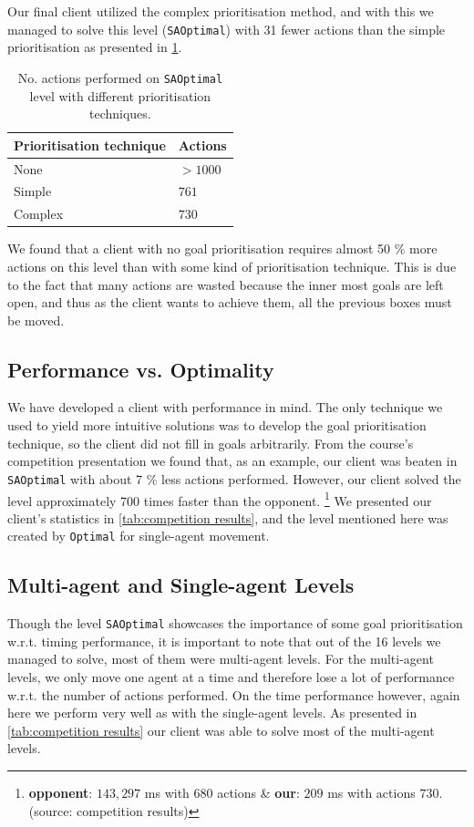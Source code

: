 Our final client utilized the complex prioritisation method, and with this we managed to solve this level (\texttt{SAOptimal}) with 31 fewer actions than the simple prioritisation as presented in \cref{tab:SAOptimal_results}.

\begin{table}[h!]
  \centering
  \begin{tabular}{@{}ll@{}}
    \toprule
    Prioritisation technique & Actions \\
    \midrule
    None    & $>1000$ \\
    Simple  & $761$ \\
    Complex & $730$ \\
    \bottomrule
  \end{tabular}
  \caption{\label{tab:SAOptimal_results}No. actions performed on \texttt{SAOptimal} level with different prioritisation techniques.}
\end{table}

We found that a client with no goal prioritisation requires almost 50 \% more actions on this level than with some kind of prioritisation technique.
This is due to the fact that many actions are wasted because the inner most goals are left open, and thus as the client wants to achieve them, all the previous boxes must be moved.

\subsection{Performance vs. Optimality}
\label{sec:performance vs. optimality}

We have developed a client with performance in mind.
The only technique we used to yield more intuitive solutions was to develop the goal prioritisation technique, so the client did not fill in goals arbitrarily.
From the course's competition presentation we found that, as an example, our client was beaten in \texttt{SAOptimal} with about 7 \% less actions performed.
However, our client solved the level approximately 700 times faster than the opponent.
\footnote{\textbf{opponent}: $143{,}297$ ms with $680$ actions \& \textbf{our}: $209$ ms with actions $730$. (source: competition results)}
We presented our client's statistics in \cref{tab:competition results}, and the level mentioned here was created by \texttt{Optimal} for single-agent movement.

\subsection{Multi-agent and Single-agent Levels}

Though the level \texttt{SAOptimal} showcases the importance of some goal prioritisation w.r.t. timing performance, it is important to note that out of the 16 levels we managed to solve, most of them were multi-agent levels. For the multi-agent levels, we only move one agent at a time and therefore lose a lot of performance w.r.t. the number of actions performed. 
On the time performance however, again here we perform very well as with the single-agent levels. 
As presented in \cref{tab:competition results} our client was able to solve most of the multi-agent levels.
